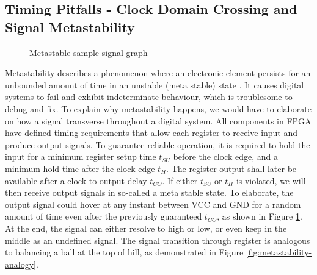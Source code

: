 \documentclass[a4paper]{report}
\begin{document}
\subsection{Timing Pitfalls - Clock Domain Crossing and Signal Metastability}
\label{section:implementation-hardware-implementation-metastability}

\begin{figure}[h!]
  \caption{Metastable sample signal graph \cite{stephenson-2009}}
  \label{fig:metastability-clock}
\end{figure}

Metastability describes a phenomenon where an electronic element persists for an unbounded amount of time in an unstable (meta stable) state \cite{chaney-1973}. It causes digital systems to fail and exhibit indeterminate behaviour, which is troublesome to debug and fix. To explain why metastability happens, we would have to elaborate on how a signal transverse throughout a digital system. All components in FPGA have defined timing requirements that allow each register to receive input and produce output signals. To guarantee reliable operation, it is required to hold the input for a minimum register setup time $t_{SU}$ before the clock edge, and a minimum hold time after the clock edge $t_{H}$. The register output shall later be available after a clock-to-output delay $t_{CO}$. If either $t_{SU}$ or $t_{H}$ is violated, we will then receive output signals in so-called a meta stable state. To elaborate, the output signal could hover at any instant between VCC and GND for a random amount of time even after the previously guaranteed $t_{CO}$, as shown in Figure \ref{fig:metastability-clock}. At the end, the signal can either resolve to high or low, or even keep in the middle as an undefined signal. The signal transition through register is analogous to balancing a ball at the top of hill, as demonstrated in Figure \ref{fig:metastability-analogy}.
\end{document}
